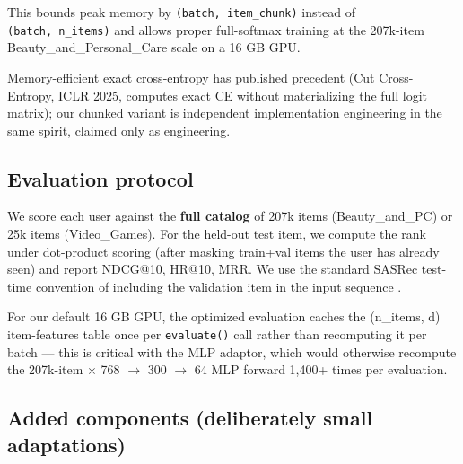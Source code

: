 This bounds peak memory by \texttt{(batch,\ item\_chunk)} instead of \texttt{(batch,\ n\_items)} and allows proper full-softmax training at the 207k-item Beauty\_and\_\allowbreak Personal\_Care scale on a 16 GB GPU.


Memory-efficient exact cross-entropy has published precedent (Cut Cross-Entropy, ICLR 2025, computes exact CE without materializing the full logit matrix); our chunked variant is independent implementation engineering in the same spirit, claimed only as engineering. 


\subsection{Evaluation protocol}\label{sec:3.6}

We score each user against the \textbf{full catalog} of 207k items (Beauty\_and\_\allowbreak PC) or 25k items (Video\_Games). For the held-out test item, we compute the rank under dot-product scoring (after masking train+val items the user has already seen) and report NDCG@10, HR@10, MRR. We use the standard SASRec test-time convention of including the validation item in the input sequence \citep{kang2018sasrec}.

For our default 16 GB GPU, the optimized evaluation caches the (n\_items, d) item-features table once per \texttt{evaluate()} call rather than recomputing it per batch --- this is critical with the MLP adaptor, which would otherwise recompute the 207k-item \ensuremath{\times} 768 \ensuremath{\rightarrow} 300 \ensuremath{\rightarrow} 64 MLP forward 1,400+ times per evaluation.


\subsection{Added components (deliberately small adaptations)}\label{sec:3.7}

